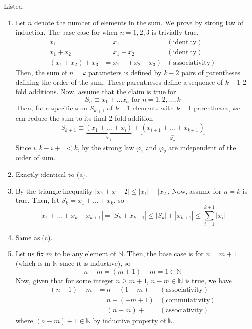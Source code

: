 \documentclass{article}
\begin{document}
    \begin{solution}
    Listed. 
    \begin{enumerate}
        \item Let $n$ denote the number of elements in the sum. We prove by strong law of induction. The base case for when $n=1, 2, 3$ is trivially true. 
        \begin{align*}
            x_1 & = x_1 & (\text{identity}) \\
            x_1 + x_2 & = x_1 + x_2 & (\text{identity}) \\
            (x_1 + x_2) + x_3 & = x_1 + (x_2 + x_3) & (\text{associativity}) 
        \end{align*}
        Then, the sum of $n=k$ parameters is defined by $k-2$ pairs of parentheses defining the order of the sum. These parentheses define a sequence of $k-1$ 2-fold additions. Now, assume that the claim is true for 
        \[S_n \equiv x_1 + \ldots x_n \text{ for } n = 1, 2, \ldots, k\]
        Then, for a specific sum $S_{k+1}$ of $k+1$ elements with $k-1$ parentheses, we can reduce the sum to its final 2-fold addition 
        \[S_{k+1} \equiv \underbrace{(x_1 + \ldots + x_i)}_{\varphi_1}  + \underbrace{(x_{i+1} + \ldots + x_{k+1})}_{\varphi_2}\]
        Since $i, k-i+1 < k$, by the strong law $\varphi_1$ and $\varphi_2$ are independent of the order of sum. 
        \item Exactly identical to (a). 
        \item By the triangle inequality $|x_1 + x+2| \leq |x_1| + |x_2|$. Now, assume for $n=k$ is true. Then, let $S_k = x_1 + \ldots + x_k$, so 
        \[|x_1 + \ldots + x_k + x_{k+1}| = |S_k + x_{k+1}| \leq |S_k| + |x_{k+1}| \leq \sum_{i=1}^{k+1} |x_{i}|\]
        \item Same as (c). 
        \item Let us fix $m$ to be any element of $\mathbb{N}$. Then, the base case is for $n = m + 1$ (which is in $\mathbb{N}$ since it is inductive), so 
        \[n - m = (m + 1) - m = 1 \in \mathbb{N}\]
        Now, given that for some integer $n \geq m+1$, $n - m \in \mathbb{N}$ is true, we have 
        \begin{align*}
            (n + 1) - m & = n + (1 - m ) & (\text{associativity}) \\
            & = n + (-m + 1) & (\text{commutativity}) \\
            & = (n - m) + 1 & (\text{associativity})
        \end{align*}
        where $(n - m) + 1 \in \mathbb{N}$ by inductive property of $\mathbb{N}$. 

\end{enumerate}
\end{solution}
\end{document}
